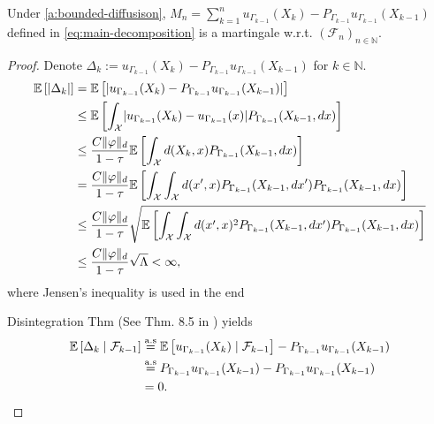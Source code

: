 \begin{lemma}
    Under \ref{a:bounded-diffusison}, $M_n = \sum_{k=1}^n  u_{\Gamma_{k-1}}(X_k) - P_{\Gamma_{k-1}}u_{\Gamma_{k-1}}(X_{k-1})$ defined in \eqref{eq:main-decomposition} is a martingale w.r.t. $(\mathcal{F}_n)_{n \in \mathbb{N}}$.
\end{lemma}
\begin{proof}
Denote $\Delta_k := u_{\Gamma_{k-1}}(X_k) - P_{\Gamma_{k-1}}u_{\Gamma_{k-1}}(X_{k-1})$ for $k \in \mathbb{N}$.
    \begin{align*}
         \mathbb{E} \left[ \lvert \Delta_k \rvert \right] &=  \mathbb{E} \left[ \lvert {u_{\Gamma_{k-1}}(X_k) - P_{\Gamma_{k-1}}u_{\Gamma_{k-1}}(X_{k-1})} \rvert \right] \\
        &\leq  \mathbb{E} \left[ \int_{\mathcal{X}} \lvert u_{\Gamma_{k-1}}(X_k) - u_{\Gamma_{k-1}}(x) \rvert P_{\Gamma_{k-1}}(X_{k-1}, dx)  \right] \\
        &\leq \frac{C \| \varphi \|_{d}}{1- \tau}  \mathbb{E} \left[ \int_{\mathcal{X}} d(X_k, x) P_{\Gamma_{k-1}}(X_{k-1}, dx)  \right] \\
        &= \frac{C \| \varphi \|_{d}}{1- \tau}  \mathbb{E} \left[ \int_{\mathcal{X}} \int_{\mathcal{X}} d(x', x) 
        P_{\Gamma_{k-1}}(X_{k-1}, dx')
        P_{\Gamma_{k-1}}(X_{k-1}, dx)  \right] \\
        &\leq \frac{C \| \varphi \|_{d}}{1- \tau} \sqrt{ \mathbb{E} \left[ \int_{\mathcal{X}} \int_{\mathcal{X}} d(x', x)^2
        P_{\Gamma_{k-1}}(X_{k-1}, dx')
        P_{\Gamma_{k-1}}(X_{k-1}, dx)  \right] }\\
        &\leq \frac{C \| \varphi \|_{d}}{1- \tau} \sqrt{\Lambda} < \infty,
    \end{align*}
     where Jensen's inequality is used in the end

    Disintegration Thm (See Thm. 8.5 in \cite{kallenberg2021foundations}) yields
    \begin{align*}
        \mathbb{E} \left[ \Delta_k \mid \mathcal{F}_{k-1} \right] &\overset{\mathrm{a.s}}{=}
        \mathbb{E} \left[  u_{\Gamma_{k-1}}(X_k) \mid \mathcal{F}_{k-1}  \right] - P_{\Gamma_{k-1}}u_{\Gamma_{k-1}}(X_{k-1}) \\
         &\overset{\mathrm{a.s}}{=} P_{\Gamma_{k-1}}u_{\Gamma_{k-1}}(X_{k-1}) - P_{\Gamma_{k-1}}u_{\Gamma_{k-1}}(X_{k-1})  \\
        &= 0.
    \end{align*}
\end{proof}

